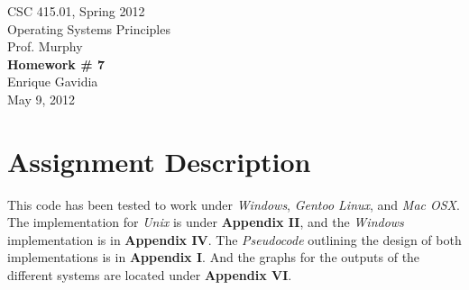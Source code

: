 \documentclass[12pt]{article}
\def \name       {Enrique Gavidia}
\def \coursenum  {CSC 415.01}
\def \coursename {Operating Systems Principles}
\def \instructor {Prof. Murphy}
\def \semester   {Spring 2012}
\def \assignment {Homework \# 7}
\def \duedate    {May 9, 2012}
\newcommand {\makecover} {
  \begin{titlepage}
    \begin{center}
      \LARGE{\coursenum, \semester \\ \coursename}\\
      \Large{\instructor}\\
      \vfill
      \textbf{\Huge \assignment}\\
      \vfill
      \Large{\name}\\
      \large{\duedate}
    \end{center}
  \end{titlepage}
}
\begin{document}
\makecover

\section*{Assignment Description}

 
This code has been tested to work under \textsl{Windows}, \textsl{Gentoo Linux}, and \textsl{Mac OSX}.
The implementation for \textsl{Unix} is under \textbf{Appendix II}, and the \textsl{Windows} implementation is in \textbf{Appendix IV}. 
The \textsl{Pseudocode} outlining the design of both implementations is in \textbf{Appendix I}.
And the graphs for the outputs of the different systems are located under \textbf{Appendix VI}.
\end{document}
